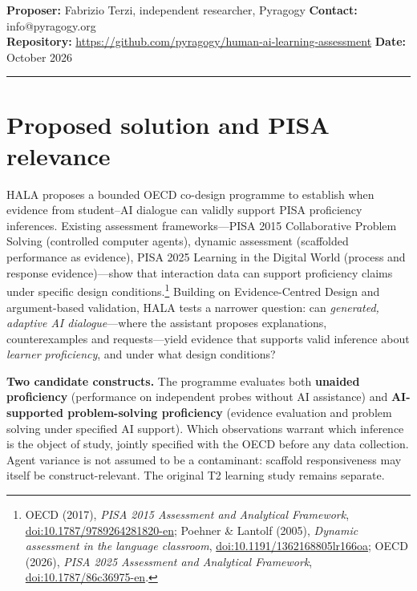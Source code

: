 \documentclass[10pt]{article}
\begin{document}
\noindent{\Huge\bfseries\textcolor{deepblue}{Human--AI Learning Assessment}\par}
\medskip
{}
\medskip
\noindent
\textbf{Proposer:} Fabrizio Terzi, independent researcher, Pyragogy\quad
\textbf{Contact:} info@pyragogy.org\\
\textbf{Repository:} \url{https://github.com/pyragogy/human-ai-learning-assessment}\quad
\textbf{Date:} October 2026

\medskip
{\color{ruleblue}\rule{\textwidth}{0.7pt}}

\section{Proposed solution and PISA relevance}

\noindent HALA proposes a bounded OECD co-design programme to establish when
evidence from student--AI dialogue can validly support PISA proficiency
inferences.  Existing assessment frameworks---PISA 2015 Collaborative Problem
Solving (controlled computer agents), dynamic assessment (scaffolded performance
as evidence), PISA 2025 Learning in the Digital World (process and response
evidence)---show that interaction data can support proficiency claims under
specific design conditions.\footnote{OECD (2017), \emph{PISA 2015 Assessment and Analytical Framework}, \href{https://doi.org/10.1787/9789264281820-en}{doi:10.1787/9789264281820-en}; Poehner \& Lantolf (2005), \emph{Dynamic assessment in the language classroom}, \href{https://doi.org/10.1191/1362168805lr166oa}{doi:10.1191/1362168805lr166oa}; OECD (2026), \emph{PISA 2025 Assessment and Analytical Framework}, \href{https://doi.org/10.1787/86c36975-en}{doi:10.1787/86c36975-en}.} Building on Evidence-Centred Design and argument-based validation, HALA tests a narrower question: can \emph{generated, adaptive AI dialogue}---where the assistant
proposes explanations, counterexamples and requests---yield evidence that
supports valid inference about \emph{learner proficiency}, and under what
design conditions?

\smallskip\noindent\textbf{Two candidate constructs.} The programme evaluates
both \textbf{unaided proficiency} (performance on independent probes without
AI assistance) and \textbf{AI-supported problem-solving proficiency}
(evidence evaluation and problem solving under specified AI support).  Which observations warrant which inference is the object
of study, jointly specified with the OECD before any data collection.  Agent
variance is not assumed to be a contaminant: scaffold responsiveness may itself
be construct-relevant. The original T2 learning study remains separate.
\end{document}
